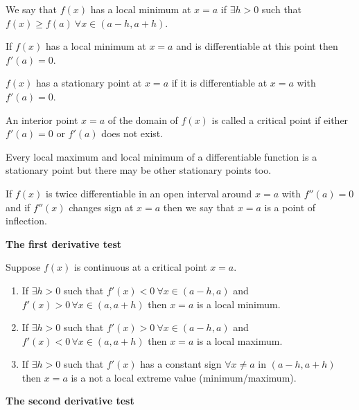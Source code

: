 \documentclass[10pt, a4paper]{article}
\begin{document}
\begin{definition}
    We say that $f(x)$ has a local minimum at $x = a$ if $\exists h > 0$ such that $f(x) \geq f(a)\ \forall x \in (a - h, a + h)$.
\end{definition}

\begin{remark}
    If $f(x)$ has a local minimum at $x = a$ and is differentiable at this point then $f'(a) = 0$.
\end{remark}

\begin{definition}
    $f(x)$ has a stationary point at $x = a$ if it is differentiable at $x =a$ with $f'(a) = 0$.
\end{definition}

\begin{definition}
    An interior point $x = a$ of the domain of $f(x)$ is called a critical point if either $f'(a) = 0$ or $f'(a)$ does not exist.
\end{definition}

Every local maximum and local minimum of a differentiable function is a stationary point but there may be other stationary points too.

\begin{definition}
    If $f(x)$ is twice differentiable in an open interval around $x = a$ with $f''(a) = 0$ and if $f''(x)$ changes sign at $x = a$ then we say that $x = a$ is a point of inflection.
\end{definition}

\textbf{The first derivative test}

Suppose $f(x)$ is continuous at a critical point $x = a$.

\begin{enumerate}[label = (\roman*)]
    \item If $\exists h > 0$ such that $f'(x) < 0\ \forall x \in (a - h, a)$ and $f'(x) > 0\, \forall x \in (a, a + h)$ then $x = a$ is a local minimum.
    \item If $\exists h > 0$ such that $f'(x) > 0\ \forall x \in (a - h, a)$ and $f'(x) < 0\, \forall x \in (a, a + h)$ then $x = a$ is a local maximum.
    \item If $\exists h > 0$ such that $f'(x)$ has a constant sign $\forall x \neq a$ in $(a - h, a + h)$ then $x = a$ is a not a local extreme value (minimum/maximum).
\end{enumerate}

\textbf{The second derivative test}
\end{document}
